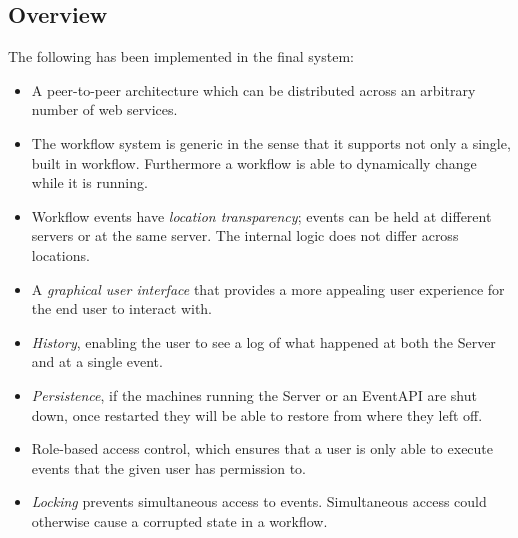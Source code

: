 \subsection{Overview}
The following has been implemented in the final system:
\begin{itemize}
\item A peer-to-peer architecture which can be distributed across an arbitrary number of web services.
\item The workflow system is generic in the sense that it supports not only a single, built in workflow. Furthermore a workflow is able to dynamically change while it is running.
\item Workflow events have \textit{location transparency}; events can be held at different servers or at the same server. The internal logic does not differ across locations. 
\item A \textit{graphical user interface} that provides a more appealing user experience for the end user to interact with. 
\item \textit{History}, enabling the user to see a log of what happened at both the Server and at a single event.
\item \textit{Persistence}, if the machines running the Server or an EventAPI are shut down, once restarted they will be able to restore from where they left off.
\item Role-based access control, which ensures that a user is only able to execute events that the given user has permission to.
\item \textit{Locking} prevents simultaneous access to events. Simultaneous access could otherwise cause a corrupted state in a workflow. 
\end{itemize}
